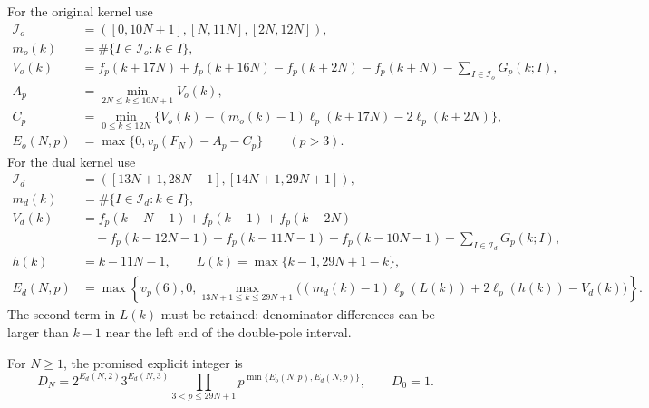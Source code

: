\documentclass[11pt]{article}
\begin{document}
For the original kernel use
\begin{align*}
 \mathcal I_o&=([0,10N+1],[N,11N],[2N,12N]),\\
 m_o(k)&=\#\{I\in\mathcal I_o:k\in I\},\\
 V_o(k)&=f_p(k+17N)+f_p(k+16N)-f_p(k+2N)-f_p(k+N)
              -\sum_{I\in\mathcal I_o}G_p(k;I),\\
 A_p&=\min_{2N\le k\le10N+1}V_o(k),\\
 C_p&=\min_{0\le k\le12N}
 \{V_o(k)-(m_o(k)-1)\ell_p(k+17N)-2\ell_p(k+2N)\},\\
 E_o(N,p)&=\max\{0,v_p(F_N)-A_p-C_p\}\qquad(p>3).
\end{align*}
For the dual kernel use
\begin{align*}
 \mathcal I_d&=([13N+1,28N+1],[14N+1,29N+1]),\\
 m_d(k)&=\#\{I\in\mathcal I_d:k\in I\},\\
 V_d(k)&=f_p(k-N-1)+f_p(k-1)+f_p(k-2N)\\
 &\quad-f_p(k-12N-1)-f_p(k-11N-1)-f_p(k-10N-1)
             -\sum_{I\in\mathcal I_d}G_p(k;I),\\
 h(k)&=k-11N-1,\qquad L(k)=\max\{k-1,29N+1-k\},\\
 E_d(N,p)&=\max\left\{v_p(6),0,
 \max_{13N+1\le k\le29N+1}
 \bigl((m_d(k)-1)\ell_p(L(k))+2\ell_p(h(k))-V_d(k)\bigr)\right\}.
\end{align*}
The second term in $L(k)$ must be retained: denominator differences can be
larger than $k-1$ near the left end of the double-pole interval.

For $N\ge1$, the promised explicit integer is
\begin{equation}\label{eq:DN}
 D_N=2^{E_d(N,2)}3^{E_d(N,3)}
       \prod_{3<p\le29N+1}p^{\min\{E_o(N,p),E_d(N,p)\}},
 \qquad D_0=1.
\end{equation}
\end{document}
